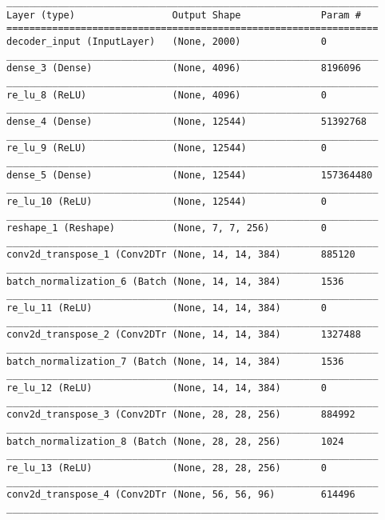 \begin{lstlisting}[caption={AlexNet-VAE Decoder},captionpos=b,basicstyle=\tiny, label={lst:alexnet-vae-decoder}]
_________________________________________________________________
Layer (type)                 Output Shape              Param #
=================================================================
decoder_input (InputLayer)   (None, 2000)              0
_________________________________________________________________
dense_3 (Dense)              (None, 4096)              8196096
_________________________________________________________________
re_lu_8 (ReLU)               (None, 4096)              0
_________________________________________________________________
dense_4 (Dense)              (None, 12544)             51392768
_________________________________________________________________
re_lu_9 (ReLU)               (None, 12544)             0
_________________________________________________________________
dense_5 (Dense)              (None, 12544)             157364480
_________________________________________________________________
re_lu_10 (ReLU)              (None, 12544)             0
_________________________________________________________________
reshape_1 (Reshape)          (None, 7, 7, 256)         0
_________________________________________________________________
conv2d_transpose_1 (Conv2DTr (None, 14, 14, 384)       885120
_________________________________________________________________
batch_normalization_6 (Batch (None, 14, 14, 384)       1536
_________________________________________________________________
re_lu_11 (ReLU)              (None, 14, 14, 384)       0
_________________________________________________________________
conv2d_transpose_2 (Conv2DTr (None, 14, 14, 384)       1327488
_________________________________________________________________
batch_normalization_7 (Batch (None, 14, 14, 384)       1536
_________________________________________________________________
re_lu_12 (ReLU)              (None, 14, 14, 384)       0
_________________________________________________________________
conv2d_transpose_3 (Conv2DTr (None, 28, 28, 256)       884992
_________________________________________________________________
batch_normalization_8 (Batch (None, 28, 28, 256)       1024
_________________________________________________________________
re_lu_13 (ReLU)              (None, 28, 28, 256)       0
_________________________________________________________________
conv2d_transpose_4 (Conv2DTr (None, 56, 56, 96)        614496
_________________________________________________________________

\end{lstlisting}
